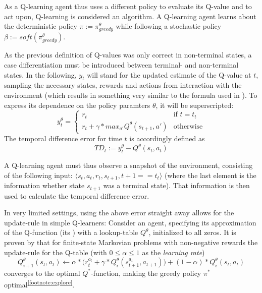 As a Q-learning agent thus uses a different policy to evaluate its Q-value and to act upon, Q-learning is considered an  algorithm. A Q-learning agent learns about the deterministic policy $\pi := \pi^\theta_{greedy}$ while following a stochastic policy $\beta := soft(\pi^\theta_{greedy})$.

As the previous definition of Q-values was only correct in non-terminal states, a case differentiation must be introduced between terminal- and non-terminal states. In the following, $y_t$ will stand for the updated estimate of the Q-value at $t$, sampling the necessary states, rewards and actions from interaction with the environment (which results in something very similar to the formula used in \cite{mnih_human-level_2015}). To express its dependence on the policy paramters $\theta$, it will be superscripted:
\begin{equation} \label{eq:ycases}
	y_t^{\theta} = \begin{cases} 
		r_t & \text{if } t = t_t\\
		r_t + \gamma * max_{a'} Q^\theta( s_{t+1}, a') & \text{otherwise}
\end{cases}
\end{equation}
The temporal difference error for time $t$ is accordingly defined as 
\begin{equation}
TD_t := y_t^\theta - Q^\theta(s_t, a_t)
\end{equation}

A Q-learning agent must thus observe a snapshot of the environment, consisting of the following input: $\langle s_t, a_t, r_t, s_{t+1}, t+1==t_t \rangle$ (where the last element is the information whether state $s_{t+1}$ was a terminal state). That information is then used to calculate the temporal difference error.

In very limited settings, using the above error straight away allows for the update-rule in simple Q-learners: Consider an agent, specifying its approximation of the Q-function (its ) with a lookup-table $Q^\theta$, initialized to all zeros. It is proven by \cite{watkins_technical_1992} that for finite-state Markovian problems with non-negative rewards the update-rule for the Q-table (with $0 \leq \alpha \leq 1$ as the \textit{learning rate})
\begin{equation} \label{eq:qtable}
	Q^\theta_{i+1}(s_t,a_t) \leftarrow \alpha * \Big(r_t^{a_t} + \gamma * Q^\theta_i(s_{t+1}^{a_t},a_{t+1}) \Big) + (1-\alpha) * Q^\theta_i(s_t,a_t)
\end{equation}
converges to the optimal $Q^*$-function, making the greedy policy $\pi^*$ optimal\textsuperscript{\ref{footnote:explore}}. \\

